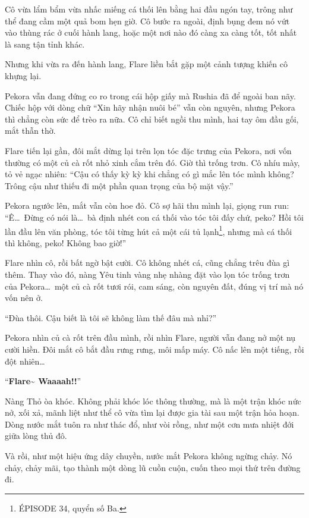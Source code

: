 \documentclass[../main.tex]{subfiles}
\begin{document}

Cô vừa lẩm bẩm vừa nhấc miếng cá thối lên bằng hai đầu ngón tay, trông như thể đang cầm một quả bom hẹn giờ. Cô bước ra ngoài, định bụng đem nó vứt vào thùng rác ở cuối hành lang, hoặc một nơi nào đó càng xa càng tốt, tốt nhất là sang tận tỉnh khác.

Nhưng khi vừa ra đến hành lang, Flare liền bắt gặp một cảnh tượng khiến cô khựng lại.

Pekora vẫn đang đứng co ro trong cái hộp giấy mà Rushia đã để ngoài ban nãy. Chiếc hộp với dòng chữ ``Xin hãy nhận nuôi bé'' vẫn còn nguyên, nhưng Pekora thì chẳng còn sức để trèo ra nữa. Cô chỉ biết ngồi thu mình, hai tay ôm đầu gối, mắt thẫn thờ.

Flare tiến lại gần, đôi mắt dừng lại trên lọn tóc đặc trưng của Pekora, nơi vốn thường có một củ cà rốt nhỏ xinh cắm trên đó. Giờ thì trống trơn. Cô nhíu mày, tỏ vẻ ngạc nhiên: ``Cậu có thấy kỳ kỳ khi chẳng có gì mắc lên tóc mình không? Trông cậu như thiếu đi một phần quan trọng của bộ mặt vậy.''

Pekora ngước lên, mắt vẫn còn hoe đỏ. Cô sợ hãi thu mình lại, giọng run run: ``Ê\dots\ Đừng có nói là\dots\ bà định nhét con cá thối vào tóc tôi đấy chứ, peko? Hồi tôi lần đầu lên văn phòng, tóc tôi từng hút cả một cái tủ lạnh\footnote{{\flaregothic ÉPISODE 34}, quyển số Ba.}, nhưng mà cá thối thì không, peko! Không bao giờ!''

Flare nhìn cô, rồi bất ngờ bật cười. Cô không nhét cá, cũng chẳng trêu đùa gì thêm. Thay vào đó, nàng Yêu tinh vàng nhẹ nhàng đặt vào lọn tóc trống trơn của Pekora\dots\ một củ cà rốt tươi rói, cam sáng, còn nguyên đất, đúng vị trí mà nó vốn nên ở.

``Đùa thôi. Cậu biết là tôi sẽ không làm thế đâu mà nhỉ?''


Pekora nhìn củ cà rốt trên đầu mình, rồi nhìn Flare, người vẫn đang nở một nụ cười hiền. Đôi mắt cô bắt đầu rưng rưng, môi mấp máy. Cô nấc lên một tiếng, rồi đột nhiên\dots

``\textbf{Flare\~{} Waaaah!!}''

Nàng Thỏ òa khóc. Không phải khóc lóc thông thường, mà là một trận khóc nức nở, xối xả, mãnh liệt như thể cô vừa tìm lại được gia tài sau một trận hỏa hoạn. Dòng nước mắt tuôn ra như thác đổ, như vòi rồng, như một cơn mưa nhiệt đới giữa lòng thủ đô.

Và rồi, như một hiệu ứng dây chuyền, nước mắt Pekora không ngừng chảy. Nó chảy, chảy mãi, tạo thành một dòng lũ cuồn cuộn, cuốn theo mọi thứ trên đường đi.
\end{document}
